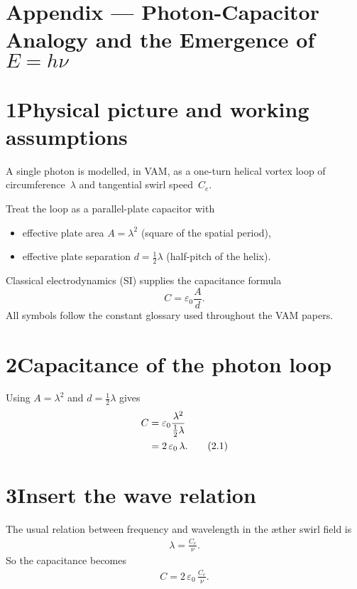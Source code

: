 \documentclass[11pt]{article}
\begin{document}
\section*{Appendix --- Photon-Capacitor Analogy and the Emergence of $E = h\nu$}

\section*{1\quad Physical picture and working assumptions}

A single photon is modelled, in VAM, as a one-turn helical vortex loop of circumference~$\lambda$ and tangential swirl speed~$C_e$.

Treat the loop as a parallel-plate capacitor with
\begin{itemize}
    \item effective plate area $A = \lambda^2$ (square of the spatial period),
    \item effective plate separation $d = \tfrac{1}{2}\lambda$ (half-pitch of the helix).
\end{itemize}

Classical electrodynamics (SI) supplies the capacitance formula
\[
    C = \varepsilon_0 \frac{A}{d}.
\]
All symbols follow the constant glossary used throughout the VAM papers.

\section*{2\quad Capacitance of the photon loop}

Using $A = \lambda^2$ and $d = \tfrac{1}{2}\lambda$ gives
\begin{align}
    C &= \varepsilon_0 \frac{\lambda^2}{\tfrac{1}{2}\lambda} \notag \\
      &= 2\,\varepsilon_0\,\lambda.
    \tag{2.1}
\end{align}

\section*{3\quad Insert the wave relation}

The usual relation between frequency and wavelength in the æther swirl field is
\begin{align}
    \lambda = \frac{C_e}{\nu}.
    \tag{3.1}
\end{align}
So the capacitance becomes
\begin{align}
    C = 2\,\varepsilon_0\,\frac{C_e}{\nu}.
    \tag{3.2}
\end{align}
\end{document}
